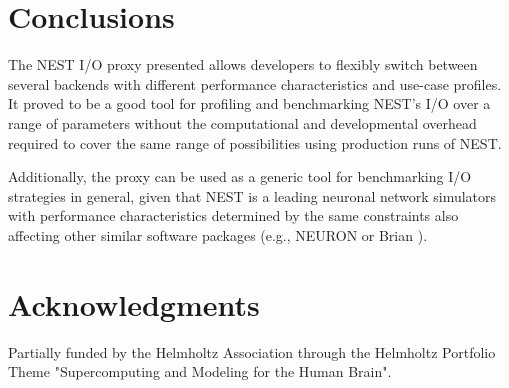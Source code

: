 \documentclass[]{YIC2015}
\begin{document}
\section{Conclusions}

The NEST I/O proxy presented allows developers to flexibly switch
between several backends with different performance characteristics
and use-case profiles. It proved to be a good tool for profiling and
benchmarking NEST's I/O over a range of parameters without the
computational and developmental overhead required to cover the same
range of possibilities using production runs of NEST.


Additionally, the proxy can be used as a generic tool for benchmarking
I/O strategies in general, given that NEST is a leading neuronal
network simulators with performance characteristics determined by the
same constraints also affecting other similar software packages (e.g.,
NEURON \cite{neuron} or Brian \cite{brian}).

\section*{Acknowledgments}

Partially funded by the Helmholtz Association through the Helmholtz
Portfolio Theme "Supercomputing and Modeling for the Human Brain".
\end{document}
